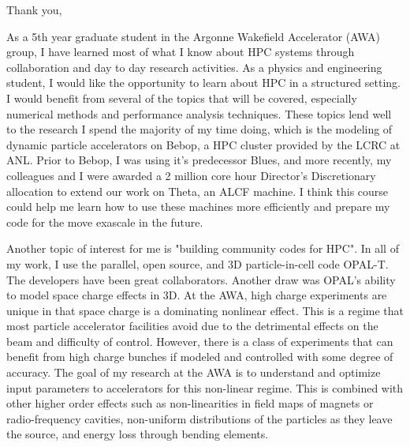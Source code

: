 \documentclass[11pt,a4paper,sans]{moderncv}        %
\begin{document}
\date{March 15, 2018}
\opening{}
\closing{Thank you,}
\makelettertitle
\vspace{-4em}

As a 5th year graduate student in the Argonne Wakefield Accelerator (AWA) group,
I have learned most of what I know about HPC systems through collaboration and
day to day research activities. As a physics and engineering student,
I would like the opportunity to learn about HPC in a structured setting. 
I would benefit from several of the topics that will be covered, 
especially numerical methods and performance analysis techniques. 
These topics lend well to the research I 
spend the majority of my time doing, which is the modeling of  
dynamic particle accelerators on Bebop, a HPC cluster provided by the 
LCRC at ANL. Prior to Bebop, I was using it's predecessor Blues, and more recently,
my colleagues and I were awarded a 2 million core hour Director's Discretionary
allocation to extend our work on Theta,
an ALCF machine.
I think this course could help me learn how to use these machines more efficiently 
and prepare my code for the move exascale in the future.

Another topic of interest for me is "building community codes for HPC". 
In all of my work, I use the parallel, open source, and
3D particle-in-cell code OPAL-T. The developers have been great collaborators.
Another draw was OPAL's ability to model space charge effects in 3D.
At the AWA, high charge experiments are unique
in that space charge is a dominating nonlinear effect. This is a regime that most
particle accelerator facilities avoid due to the detrimental effects on the beam
and difficulty of control.
However, there is a class of experiments that can benefit from high charge bunches
if modeled and controlled with some degree of accuracy. The goal of my research
at the AWA is to understand and optimize input parameters to accelerators for
this non-linear regime. This is combined with other higher order effects 
such as non-linearities in field maps of magnets or radio-frequency cavities, 
non-uniform distributions of the particles as they leave the source, 
and energy loss through bending elements.
\end{document}

